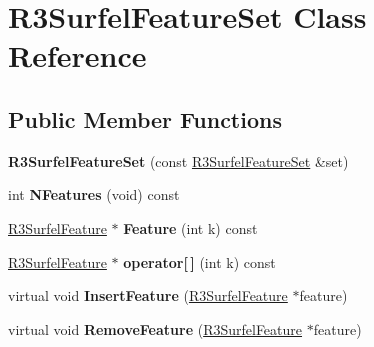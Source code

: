 \hypertarget{class_r3_surfel_feature_set}{}\section{R3\+Surfel\+Feature\+Set Class Reference}
\label{class_r3_surfel_feature_set}
\subsection*{Public Member Functions}
\begin{DoxyCompactItemize}
\item 
{\bfseries R3\+Surfel\+Feature\+Set} (const \hyperlink{class_r3_surfel_feature_set}{R3\+Surfel\+Feature\+Set} \&set)\hypertarget{class_r3_surfel_feature_set_adddbe3efa10dad77fe0e0c8a59464708}{}\label{class_r3_surfel_feature_set_adddbe3efa10dad77fe0e0c8a59464708}

\item 
int {\bfseries N\+Features} (void) const \hypertarget{class_r3_surfel_feature_set_aa525db28d564c08df6d88ba2a398ef13}{}\label{class_r3_surfel_feature_set_aa525db28d564c08df6d88ba2a398ef13}

\item 
\hyperlink{class_r3_surfel_feature}{R3\+Surfel\+Feature} $\ast$ {\bfseries Feature} (int k) const \hypertarget{class_r3_surfel_feature_set_ab47c50218a0990d104b888f16340e8b8}{}\label{class_r3_surfel_feature_set_ab47c50218a0990d104b888f16340e8b8}

\item 
\hyperlink{class_r3_surfel_feature}{R3\+Surfel\+Feature} $\ast$ {\bfseries operator\mbox{[}$\,$\mbox{]}} (int k) const \hypertarget{class_r3_surfel_feature_set_a4057524060a95493e41f130e6c21c86c}{}\label{class_r3_surfel_feature_set_a4057524060a95493e41f130e6c21c86c}

\item 
virtual void {\bfseries Insert\+Feature} (\hyperlink{class_r3_surfel_feature}{R3\+Surfel\+Feature} $\ast$feature)\hypertarget{class_r3_surfel_feature_set_abd8ebd244566e1436db16f05ef5340ab}{}\label{class_r3_surfel_feature_set_abd8ebd244566e1436db16f05ef5340ab}

\item 
virtual void {\bfseries Remove\+Feature} (\hyperlink{class_r3_surfel_feature}{R3\+Surfel\+Feature} $\ast$feature)\hypertarget{class_r3_surfel_feature_set_aaa41521cd85d56af7c596dbd3d2af526}{}\label{class_r3_surfel_feature_set_aaa41521cd85d56af7c596dbd3d2af526}


\end{DoxyCompactItemize}
